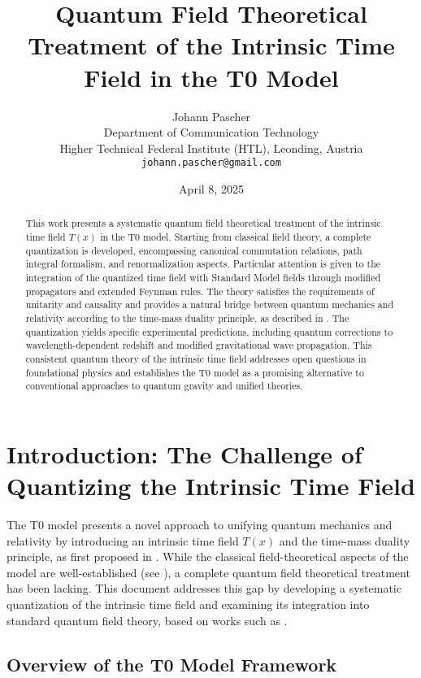 \documentclass[12pt,a4paper]{article}
\title{Quantum Field Theoretical Treatment of the Intrinsic Time Field in the T0 Model}
\author{Johann Pascher\\
	Department of Communication Technology\\
	Higher Technical Federal Institute (HTL), Leonding, Austria\\
	\texttt{johann.pascher@gmail.com}}
\date{April 8, 2025}
\newcommand{\Tfield}{T(x)}
\begin{document}
	
	\maketitle
	
	\begin{abstract}
		This work presents a systematic quantum field theoretical treatment of the intrinsic time field $\Tfield$ in the T0 model. Starting from classical field theory, a complete quantization is developed, encompassing canonical commutation relations, path integral formalism, and renormalization aspects. Particular attention is given to the integration of the quantized time field with Standard Model fields through modified propagators and extended Feynman rules. The theory satisfies the requirements of unitarity and causality and provides a natural bridge between quantum mechanics and relativity according to the time-mass duality principle, as described in \cite{pascher_dualismus_2025_en}. The quantization yields specific experimental predictions, including quantum corrections to wavelength-dependent redshift and modified gravitational wave propagation. This consistent quantum theory of the intrinsic time field addresses open questions in foundational physics and establishes the T0 model as a promising alternative to conventional approaches to quantum gravity and unified theories.
	\end{abstract}
	
	\tableofcontents
	\newpage
	
	\section{Introduction: The Challenge of Quantizing the Intrinsic Time Field}
	\label{sec:einleitung}
	
	The T0 model presents a novel approach to unifying quantum mechanics and relativity by introducing an intrinsic time field $\Tfield$ and the time-mass duality principle, as first proposed in \cite{pascher_zeit_masse_2025_en}. While the classical field-theoretical aspects of the model are well-established (see \cite{pascher_lagrange_2025_en}), a complete quantum field theoretical treatment has been lacking. This document addresses this gap by developing a systematic quantization of the intrinsic time field and examining its integration into standard quantum field theory, based on works such as \cite{pascher_erweiterung_2025_en}.
	
	\subsection{Overview of the T0 Model Framework}
	\label{sec:ueberblick}
	
\end{document}
